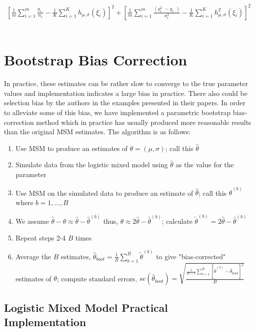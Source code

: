 \documentclass[11pt]{article}\usepackage[]{graphicx}\usepackage[]{color}
\begin{document}
\begin{align*}
\left[\frac{1}{m}\sum_{i=1}^m \frac{y_{i\cdot}}{n_i}-\frac{1}{K}\sum_{i=1}^K h_{\mu,\sigma}(\xi_i)\right]^2+\left[\frac{1}{m}\sum_{i=1}^m \frac{(y_{i\cdot}^2-y_{i\cdot})}{n_i^2}-\frac{1}{K}\sum_{i=1}^K h_{\mu,\sigma}^2(\xi_i)\right]^2
\end{align*}
\\

\section{Bootstrap Bias Correction}
In practice, these estimates can be rather slow to converge to the true parameter values and implementation indicates a large bias in practice.  There also could be selection bias by the authors in the examples presented in their papers.  In order to alleviate some of this bias, we have implemented a parametric bootstrap bias-correction method which in practice has usually produced more reasonable results than the original MSM estimates.  The algorithm is as follows:

\begin{enumerate}
\item Use MSM to produce an estimates of $\theta=(\mu,\sigma)$; call this $\hat\theta$
\item Simulate data from the logistic mixed model using $\hat\theta$ as the value for the parameter
\item Use MSM on the simulated data to produce an estimate of $\hat\theta$; call this $\hat\theta^{(b)}$ where $b=1,...,B$
\item We assume $\hat\theta-\theta\approx \hat\theta-\hat\theta^{(b)}$ thus, $\theta\approx 2\hat\theta-\hat\theta^{(b)}$; calculate $\tilde\theta^{(b)}= 2\hat\theta-\hat\theta^{(b)}$
\item Repeat steps 2-4 $B$ times
\item Average the $B$ estimates, $\displaystyle \hat{\theta}_{boot}=\frac{1}{B}\sum_{b=1}^B \tilde\theta^{(b)}$ to give "bias-corrected" estimates of $\theta$; compute standard errors, $se(\hat{\theta}_{boot})=\displaystyle\sqrt{\frac{\frac{1}{B-1}\sum_{b=1}^B [\tilde\theta^{(b)}-\hat{\theta}_{boot}]^2}{B}}$
\end{enumerate}

\newpage\subsection{Logistic Mixed Model Practical Implementation}
\end{document}
